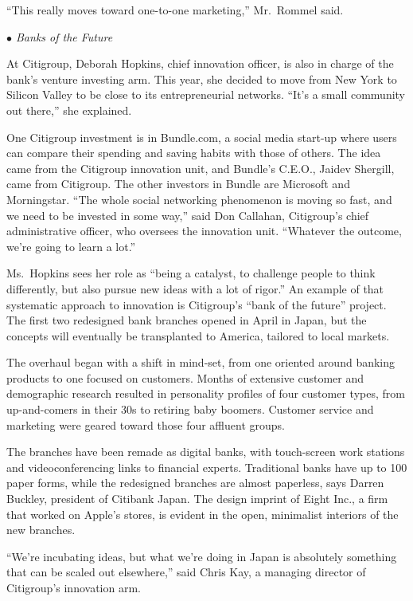 ﻿\documentclass[12pt]{article}
\begin{document}
``This really moves toward one-to-one marketing,'' Mr.~Rommel said.

\emph{$\bullet$ Banks of the Future}

At Citigroup, Deborah Hopkins, chief innovation officer, is also in charge of the bank's venture
investing arm. This year, she decided to move from New York to Silicon Valley to be close to its
entrepreneurial networks. ``It's a small community out there,'' she explained.

One Citigroup investment is in Bundle.com, a social media start-up where users can compare their
spending and saving habits with those of others. The idea came from the Citigroup innovation unit,
and Bundle's C.E.O., Jaidev Shergill, came from Citigroup. The other investors in Bundle are
Microsoft and Morningstar. ``The whole social networking phenomenon is moving so fast, and we need
to be invested in some way,'' said Don Callahan, Citigroup's chief administrative officer, who
oversees the innovation unit. ``Whatever the outcome, we're going to learn a lot.''

Ms.~Hopkins sees her role as ``being a catalyst, to challenge people to think differently, but also
pursue new ideas with a lot of rigor.'' An example of that systematic approach to innovation is
Citigroup's ``bank of the future'' project. The first two redesigned bank branches opened in April
in Japan, but the concepts will eventually be transplanted to America, tailored to local markets.

The overhaul began with a shift in mind-set, from one oriented around banking products to one
focused on customers. Months of extensive customer and demographic research resulted in personality
profiles of four customer types, from up-and-comers in their 30s to retiring baby boomers. Customer
service and marketing were geared toward those four affluent groups.

The branches have been remade as digital banks, with touch-screen work stations and
videoconferencing links to financial experts. Traditional banks have up to 100 paper forms, while
the redesigned branches are almost paperless, says Darren Buckley, president of Citibank Japan. The
design imprint of Eight Inc., a firm that worked on Apple's stores, is evident in the open,
minimalist interiors of the new branches.

``We're incubating ideas, but what we're doing in Japan is absolutely something that can be scaled
out elsewhere,'' said Chris Kay, a managing director of Citigroup's innovation arm.
\end{document}
